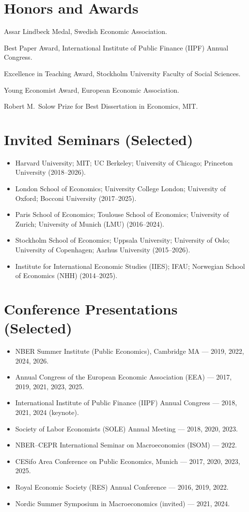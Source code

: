 \documentclass[11pt]{article}
\newcommand{\dated}[2]{%
  \noindent\makebox[5.2em][l]{\textcolor{mutedgray}{#1}}%
  \begin{minipage}[t]{\dimexpr\linewidth-5.4em\relax}#2\end{minipage}\par\vspace{3pt}}
\begin{document}
\section{Honors and Awards}
\dated{2025}{Assar Lindbeck Medal, Swedish Economic Association.}
\dated{2024}{Best Paper Award, International Institute of Public Finance (IIPF) Annual Congress.}
\dated{2023}{Excellence in Teaching Award, Stockholm University Faculty of Social Sciences.}
\dated{2019}{Young Economist Award, European Economic Association.}
\dated{2011}{Robert M.\ Solow Prize for Best Dissertation in Economics, MIT.}

\section{Invited Seminars (Selected)}
\begin{itemize}
\item Harvard University; MIT; UC Berkeley; University of Chicago; Princeton University (2018--2026).
\item London School of Economics; University College London; University of Oxford; Bocconi University (2017--2025).
\item Paris School of Economics; Toulouse School of Economics; University of Zurich; University of Munich (LMU) (2016--2024).
\item Stockholm School of Economics; Uppsala University; University of Oslo; University of Copenhagen; Aarhus University (2015--2026).
\item Institute for International Economic Studies (IIES); IFAU; Norwegian School of Economics (NHH) (2014--2025).
\end{itemize}

\section{Conference Presentations (Selected)}
\begin{itemize}
\item NBER Summer Institute (Public Economics), Cambridge MA --- 2019, 2022, 2024, 2026.
\item Annual Congress of the European Economic Association (EEA) --- 2017, 2019, 2021, 2023, 2025.
\item International Institute of Public Finance (IIPF) Annual Congress --- 2018, 2021, 2024 (keynote).
\item Society of Labor Economists (SOLE) Annual Meeting --- 2018, 2020, 2023.
\item NBER--CEPR International Seminar on Macroeconomics (ISOM) --- 2022.
\item CESifo Area Conference on Public Economics, Munich --- 2017, 2020, 2023, 2025.
\item Royal Economic Society (RES) Annual Conference --- 2016, 2019, 2022.
\item Nordic Summer Symposium in Macroeconomics (invited) --- 2021, 2024.
\end{itemize}
\end{document}
